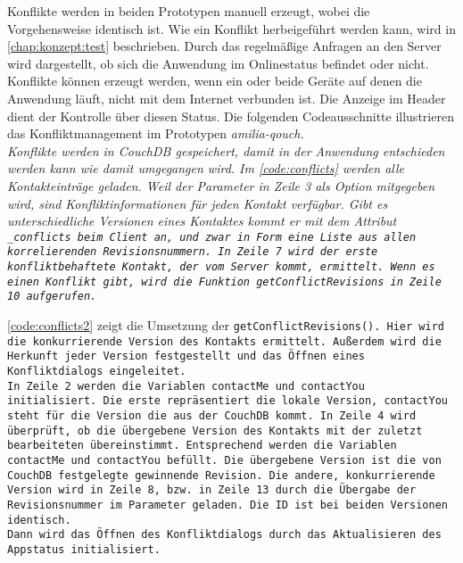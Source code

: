 Konflikte werden in beiden Prototypen manuell erzeugt, wobei die Vorgehensweise identisch ist.
Wie ein Konflikt herbeigeführt werden kann, wird in \autoref{chap:konzept:test} beschrieben.
Durch das regelmäßige Anfragen an den Server wird dargestellt, ob sich die Anwendung im Onlinestatus befindet oder nicht.
Konflikte können erzeugt werden, wenn ein oder beide Geräte auf denen die Anwendung läuft, nicht mit dem Internet verbunden ist.
Die Anzeige im Header dient der Kontrolle über diesen Status.
Die folgenden Codeausschnitte illustrieren das Konfliktmanagement im Prototypen \it{amilia-qouch}.\\
Konflikte werden in CouchDB gespeichert, damit in der Anwendung entschieden werden kann wie damit umgegangen wird.
Im \autoref{code:conflicts} werden alle Kontakteinträge geladen.
Weil der Parameter in Zeile 3 als Option mitgegeben wird, sind Konfliktinformationen für jeden Kontakt verfügbar.
Gibt es unterschiedliche Versionen eines Kontaktes kommt er mit dem Attribut \tt{\_conflicts} beim Client an, und zwar in Form eine Liste aus allen korrelierenden Revisionsnummern.
In Zeile 7 wird der erste konfliktbehaftete Kontakt, der vom Server kommt, ermittelt.
Wenn es einen Konflikt gibt, wird die Funktion \tt{getConflictRevisions} in Zeile 10 aufgerufen.
%
\begin{center}
  
\end{center}
%
\autoref{code:conflicts2} zeigt die Umsetzung der \tt{getConflictRevisions()}.
Hier wird die konkurrierende Version des Kontakts ermittelt.
Außerdem wird die Herkunft jeder Version festgestellt und das Öffnen eines Konfliktdialogs eingeleitet.\\
In Zeile 2 werden die Variablen \tt{contactMe} und \tt{contactYou} initialisiert.
Die erste repräsentiert die lokale Version, \tt{contactYou} steht für die Version die aus der CouchDB kommt.
In Zeile 4 wird überprüft, ob die übergebene Version des Kontakts mit der zuletzt bearbeiteten übereinstimmt.
Entsprechend werden die Variablen \tt{contactMe} und \tt{contactYou} befüllt.
Die übergebene Version ist die von CouchDB festgelegte gewinnende Revision.
Die andere, konkurrierende Version wird in Zeile 8, bzw. in Zeile 13 durch die Übergabe der Revisionsnummer im Parameter geladen.
Die ID ist bei beiden Versionen identisch.\\
%
Dann wird das Öffnen des Konfliktdialogs durch das Aktualisieren des \gls{App}status initialisiert.
